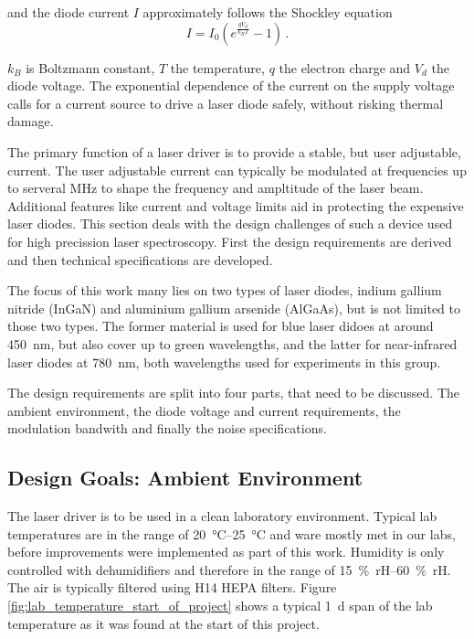 and the diode current $I$ approximately follows the Shockley equation \cite{shockley_diode}
\begin{equation}
    I = I_0 \left( e^{\frac{qV_d}{k_B T}} - 1\right) \, .
\end{equation}

$k_B$ is Boltzmann constant, $T$ the temperature, $q$ the electron charge and $V_d$ the diode voltage. The exponential dependence of the current on the supply voltage calls for a current source to drive a laser diode safely, without risking thermal damage.

The primary function of a laser driver is to provide a stable, but user adjustable, current. The user adjustable current can typically be modulated at frequencies up to serveral \unit{\MHz} to shape the frequency and ampltitude of the laser beam. Additional features like current and voltage limits aid in protecting the expensive laser diodes. This section deals with the design challenges of such a device used for high precission laser spectroscopy. First the design requirements are derived and then technical specifications are developed.

The focus of this work many lies on two types of laser diodes, indium gallium nitride (InGaN) and aluminium gallium arsenide (AlGaAs), but is not limited to those two types. The former material is used for blue laser didoes at around \qty{450}{\nm}, but also cover up to green wavelengths, and the latter for near-infrared laser diodes at \qty{780}{\nm}, both wavelengths used for experiments in this group.

The design requirements are split into four parts, that need to be discussed. The ambient environment, the diode voltage and current requirements, the modulation bandwith and finally the noise specifications.

\clearpage
\subsection{Design Goals: Ambient Environment}
The laser driver is to be used in a clean laboratory environment. Typical lab temperatures are in the range of \qtyrange{20}{25}{\celsius} and ware mostly met in our labs, before improvements were implemented as part of this work. Humidity is only controlled with dehumidifiers and therefore in the range of \qtyrange{15}{60}{\percent rH}. The air is typically filtered using H14 HEPA filters. Figure \ref{fig:lab_temperature_start_of_project} shows a typical \qty{1}{d} span of the lab temperature as it was found at the start of this project.

